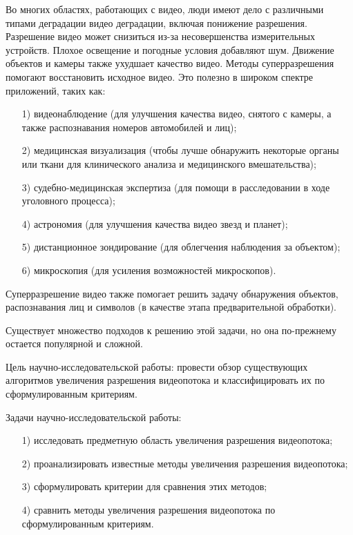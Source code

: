 \documentclass{bmstu}
\begin{document}
Во многих областях, работающих с видео, люди имеют дело с различными типами деградации видео деградации, включая понижение разрешения. 
Разрешение видео может снизиться из-за несовершенства измерительных устройств. 
Плохое освещение и погодные условия добавляют шум. 
Движение объектов и камеры также ухудшает качество видео. 
Методы суперразрешения помогают восстановить исходное видео. 
Это полезно в широком спектре приложений, таких как:
\begin{enumerate}
\item[1)] видеонаблюдение (для улучшения качества видео, снятого с камеры, а также распознавания номеров автомобилей и лиц);
\item[2)] медицинская визуализация (чтобы лучше обнаружить некоторые органы или ткани для клинического анализа и медицинского вмешательства);
\item[3)] судебно-медицинская экспертиза (для помощи в расследовании в ходе уголовного процесса);
\item[4)] астрономия (для улучшения качества видео звезд и планет);
\item[5)] дистанционное зондирование (для облегчения наблюдения за объектом);
\item[6)] микроскопия (для усиления возможностей микроскопов).
\end{enumerate}

Суперразрешение видео также помогает решить задачу обнаружения объектов, распознавания лиц и символов (в качестве этапа предварительной обработки).

Существует множество подходов к решению этой задачи, но она по-прежнему остается популярной и сложной.

Цель научно-исследовательской работы: провести обзор существующих алгоритмов увеличения разрешения видеопотока и классифицировать их по сформулированным критериям.

Задачи научно-исследовательской работы:
\begin{enumerate}
\item[1)] исследовать предметную область увеличения разрешения видеопотока;
\item[2)] проанализировать известные методы увеличения разрешения видеопотока;
\item[3)] сформулировать критерии для сравнения этих методов;
\item[4)] сравнить методы увеличения разрешения видеопотока по сформулированным критериям.
\end{enumerate}
\end{document}
